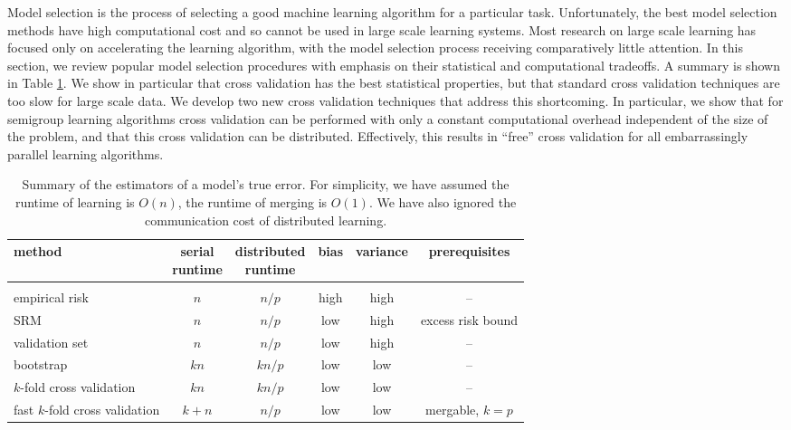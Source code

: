 \documentclass[thesis.tex]{subfiles}
\begin{document}
Model selection is the process of selecting a good machine learning algorithm for a particular task.
Unfortunately, the best model selection methods have high computational cost and so cannot be used in large scale learning systems.
Most research on large scale learning has focused only on accelerating the learning algorithm,
with the model selection process receiving comparatively little attention.
In this section, we review popular model selection procedures with emphasis on their statistical and computational tradeoffs.
A summary is shown in Table \ref{tab:cv}.
We show in particular that cross validation has the best statistical properties,
but that standard cross validation techniques are too slow for large scale data.
We develop two new cross validation techniques that address this shortcoming.
In particular, we show that for semigroup learning algorithms
cross validation can be performed with only a constant computational overhead independent of the size of the problem,
and that this cross validation can be distributed.
Effectively, this results in ``free'' cross validation for all embarrassingly parallel learning algorithms.

\begin{table}[t]
    \centering
    \begin{tabular}{lccccc}
        method & \makecell{serial \\ runtime} & \makecell{distributed\\ runtime} & bias & variance & prerequisites \\
        \hline
        \vspace{-0.1in}
        \\
        empirical risk & $n$ & ${n}/{p}$ & high & high & --\\
        SRM & $n$ & ${n}/{p}$ & low & high & excess risk bound\\
        validation set & $n$ & ${n}/{p}$ & low & high& -- \\
        bootstrap & $kn$ & ${kn}/{p}$ & low & low & --\\
        $k$-fold cross validation & $kn$ & ${kn}/{p}$ & low & low & --\\
        fast $k$-fold cross validation & $k+n$ & ${n}/{p}$ & low & low & mergable, $k=p$\\
    \end{tabular}
    \caption{Summary of the estimators of a model's true error.
        For simplicity, we have assumed the runtime of learning is $O(n)$,
        the runtime of merging is $O(1)$.
        We have also ignored the communication cost of distributed learning.
    }
    \label{tab:cv}
\end{table}
\end{document}
